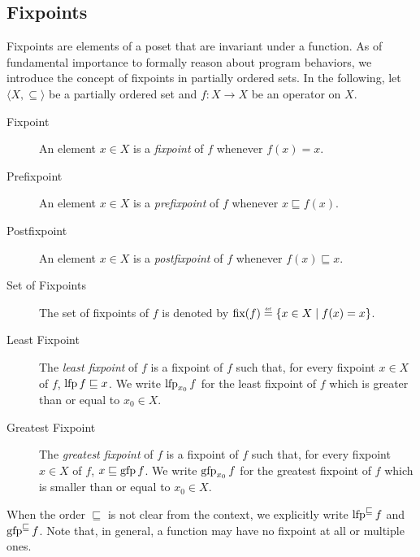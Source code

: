 \subsection{Fixpoints}

Fixpoints are elements of a poset that are invariant under a function.
As of fundamental importance to formally reason about program behaviors, we introduce the concept of fixpoints in partially ordered sets.
In the following, let $\langle X, \subseteq \rangle$ be a partially ordered set and $f : X \to X$ be an operator on $X$.

\begin{description}
  \item[Fixpoint] An element $x \in X$ is a \emph{fixpoint} of $f$ whenever $f(x) = x$.
  \item[Prefixpoint] An element $x \in X$ is a \emph{prefixpoint} of $f$ whenever $x \sqsubseteq f(x)$.
  \item[Postfixpoint] An element $x \in X$ is a \emph{postfixpoint} of $f$ whenever $f(x) \sqsubseteq x$.
  \item[Set of Fixpoints] The set of fixpoints of $f$ is denoted by $\fixpoints(f) \defeq \setdef{x \in X}{f(x) = x}$.
  \item[Least Fixpoint] The \emph{least fixpoint} of $f$ is a fixpoint of $f$ such that, for every fixpoint $x \in X$ of $f$, $\operatorname{lfp} f \sqsubseteq x$. We write $\operatorname{lfp}_{x_0} f$ for the least fixpoint of $f$ which is greater than or equal to $x_0 \in X$.
  \item[Greatest Fixpoint] The \emph{greatest fixpoint} of $f$ is a fixpoint of $f$ such that, for every fixpoint $x \in X$ of $f$, $x \sqsubseteq \operatorname{gfp} f$. We write $\operatorname{gfp}_{x_0} f$ for the greatest fixpoint of $f$ which is smaller than or equal to $x_0 \in X$.
\end{description}

When the order $\sqsubseteq$ is not clear from the context, we explicitly write $\operatorname{lfp}^{\sqsubseteq} f$ and $\operatorname{gfp}^{\sqsubseteq} f$. Note that, in general, a function may have no fixpoint at all or multiple ones.

